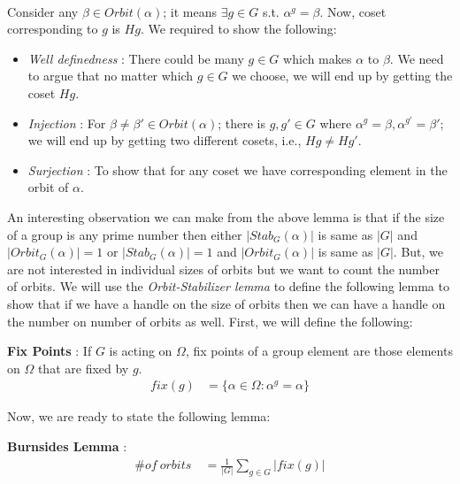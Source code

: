 \paragraph{}
Consider any $\beta\in Orbit(\alpha)$; it means $\exists g\in G $ s.t. $\alpha^g=\beta $. Now, coset corresponding to $g$ is $Hg$. We required to show the following:
\begin{itemize}
\item \emph{Well definedness} : There could be many $g\in G$ which makes $\alpha$ to $\beta$. We need to argue that no matter which $g\in G$ we choose, we will end up by getting the coset $Hg$.
\item \emph{Injection} : For $\beta\neq \beta'\in Orbit(\alpha)$; there is $g,g'\in G$ where $\alpha^g=\beta,\alpha^{g'}=\beta'$; we will end up by getting two different cosets, i.e., $Hg\neq Hg' $.
\item \emph{Surjection} : To show that for any coset we have corresponding element in the orbit of $\alpha$.
\end{itemize}
An interesting observation we can make from the above lemma is that if the size of a group is any prime number then either $|Stab_G(\alpha)|$ is same as $|G|$ and $|Orbit_G(\alpha)|=1$ or $|Stab_G(\alpha)|=1$ and $|Orbit_G(\alpha)|$ is same as $|G|$. But, we are not interested in individual sizes of orbits but we want to count the number of orbits. We will use the \emph{Orbit-Stabilizer lemma} to define the following lemma to show that if we have a handle on the size of orbits then we can have a handle on the number on number of orbits as well. First, we will define the following:
\begin{definition}
\textbf{Fix Points} : If $G$ is acting on $\Omega$, fix points of a group element are those elements on $\Omega$ that are fixed by $g$.
\begin{align*}
fix(g)&=\{\alpha\in \Omega: \alpha^g=\alpha \}
\end{align*}
\end{definition}
Now, we are ready to state the following lemma:
\begin{lemma}
\textbf{Burnsides Lemma} : 
\begin{align*}
\#of \ orbits \ &=\frac{1}{|G|}\sum_{g\in G}|fix(g)|
\end{align*}
\end{lemma}
